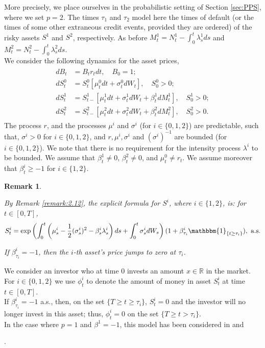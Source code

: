 \documentclass[11pt,a4paper]{article}
\numberwithin{equation}{section}
\theoremstyle{newPlain}
\theoremstyle{newDefinition}
\theoremstyle{newRemark}
\newtheorem{remark}[theorem]{Remark}
\begin{document}
{More precisely, we place ourselves in the probabilistic setting of Section \ref{sec:PPS}, where we set $p=2$. The times $\tau_1$ and $\tau_2$ model here the times of default (or the times of some other extraneous credit events, provided they are ordered) of the risky assets $S^1$ and $S^2$, respectively. As before $M_t^1 = N_t^1 - \int_0^t\lambda_s^1ds$ and $M_t^2 = N_t^2 - \int_0^t\lambda_s^2ds$. \\
We consider the following dynamics for the asset prices,
\begin{align}\label{eq:3.1}
    \begin{aligned}
    dB_t &= B_tr_tdt,\quad B_0=1;\\
    dS_t^0 &= S_t^0[\mu_t^0dt + \sigma_t^0dW_t],\quad S_0^0>0;\\
    dS_t^1 &= S_{t-}^1[\mu_t^1dt + \sigma_t^1dW_t + \beta_t^1dM_t^1],\quad S_0^1>0;\\
    dS_t^2 &= S_{t-}^2[\mu_t^2dt + \sigma_t^2dW_t + \beta_t^2dM_t^2],\quad S_0^2>0.
    \end{aligned}
\end{align}The process $r$, and the processes $\mu^i$ and $\sigma^i$ (for $i\in\{0,1,2\}$) are predictable, such that, $\sigma^i>0$ for $i\in\{0,1,2\}$, and $r,\mu^i,\sigma^i$ and $(\sigma^i)^{-1}$ are bounded (for $i\in\{0,1,2\}$). We note that there is no requirement for the intensity process $\lambda^i$ to be bounded. We assume that $\beta_t^1\neq 0$,  $\beta_t^2\neq 0$, and $\mu_t^0\neq r_t$. We assume moreover that $\beta_t^i\ge-1$ for $i\in\{1,2\}$.

\begin{remark}\label{remark:PriceProcess}

    By Remark \ref{remark:2.12}, the  explicit formula for $S^i$, where $i\in\{1,2\}$, is: for $t\in[0,T]$,
    \begin{equation}\label{eq:remarkPriceProcess}
        S_t^i = \exp\left(\int_0^t\left(\mu_s^i- \frac{1}{2}(\sigma_s^i)^2-\beta_s^i\lambda_s^i\right)ds+\int_0^t\sigma_s^idW_s \right)(1+\beta_{\tau_i}^i\mathbbm{1}_{\{t\ge\tau_i\}}),\text{  a.s.}
    \end{equation}

    If $\beta^i_{\tau_i}=-1$,  then  the $i$-th asset's price jumps to zero at $\tau_i$.
    
\end{remark} %

We consider an investor who at time $0$ invests an amount $x\in\mathbb{R}$ in the market. For $i\in\{0,1,2\}$ we use $\phi_t^i$ to denote the amount of money in asset $S_t^i$ at time $t\in[0,T]$.\\
 If $\beta_{\tau_i}^i=-1$ a.s., then, on the set $\{T\ge t\ge\tau_i\}$, $S_t^i=0$ and  the investor will no longer invest in this asset; thus, $\phi_t^i=0$ on the set $\{T\ge t>\tau_i\}$. \\
In the case where $p=1$ and $\beta^1=-1$, this model has been considered in  \cite{bielecki2} and \cite{dumitrescu2018bsdes}}. 
\end{document}
